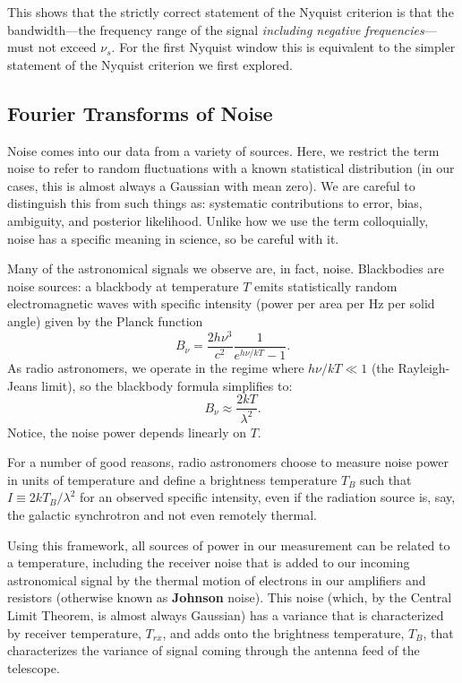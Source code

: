 \documentclass[11pt,preprint]{aastex}
\begin{document}
This shows that the strictly correct statement of the Nyquist criterion
is that the bandwidth---the frequency range of the
signal {\it including negative frequencies}---must not exceed $\nu_s$. For the first Nyquist window this
is equivalent to the simpler statement of the Nyquist criterion we first
explored.

\subsection{Fourier Transforms of Noise}

\noindent
Noise comes into our data from a variety of sources. 
Here, we restrict the term noise to refer to random fluctuations with a known statistical distribution (in
our cases, this is almost always a Gaussian with mean zero). We are careful to distinguish
this from such things as: systematic contributions to error, bias, ambiguity, and posterior likelihood.
Unlike how we use the term colloquially, noise has a specific meaning in science, so be careful with it.

Many of the astronomical signals we observe are, in fact, noise. 
Blackbodies are noise sources: a blackbody at temperature $T$ emits statistically 
random electromagnetic waves
with specific intensity (power per area per Hz per solid angle) given by the 
Planck function
\begin{equation}
B_\nu = \frac{2h\nu^3}{c^2}\frac{1}{e^{h\nu/kT}-1}. 
\end{equation}
As radio astronomers, we
operate in the regime where $h\nu/kT \ll 1$ (the Rayleigh-Jeans limit), 
so the blackbody formula simplifies to:
\begin{equation}
B_\nu\approx\frac{2kT}{\lambda^2}. 
\end{equation}
Notice, the noise power depends linearly on $T$. 

For a number of good reasons, radio astronomers choose to measure noise
power in units of temperature and define a brightness temperature
$T_B$ such that $I\equiv2kT_B/\lambda^2$ for an observed specific intensity,
even if the radiation source is, say, the galactic synchrotron and not even remotely thermal.

Using this framework, all sources of power in our measurement can be related to a temperature,
including the receiver noise that is added to our incoming astronomical signal 
by the thermal motion of electrons in our amplifiers and resistors 
(otherwise known as {\bf Johnson} noise).  This noise (which,
by the Central Limit Theorem, is almost always Gaussian) has a variance that
is characterized by receiver temperature, $T_{rx}$, and adds onto the brightness temperature, $T_B$, 
that characterizes the variance of signal coming through the antenna feed of the telescope.
\end{document}
